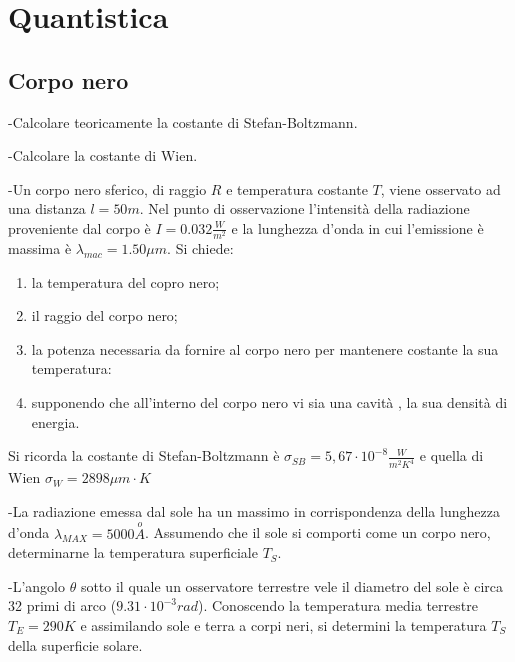 \documentclass[12pt,twoside,a4]{article}
\begin{document}
\newpage
{}
\section{Quantistica}
\renewcommand{\theindexese}{$\Q$}
\setcounter{subsection}{6}
\subsection{Corpo nero}
\begin{esercizio}
	-Calcolare teoricamente la costante di Stefan-Boltzmann.
	
\end{esercizio}

\begin{esercizio}
	-Calcolare la costante di Wien.
\end{esercizio}

\begin{esercizio}
	-Un corpo nero sferico, di raggio $R$ e temperatura costante $T$, viene osservato ad una distanza $l = 50 m$. Nel punto di osservazione l'intensità  della
radiazione proveniente dal corpo  è $I = 0.032 \frac{W}{m^2}$ e la lunghezza d'onda in cui 
l'emissione è massima è $\lambda_{mac}=1.50 \mu m$. Si chiede:
\begin{enumerate}[label=(\textit{\roman*})]
	\item la temperatura del copro nero;
	\item il raggio del corpo nero;
	\item la potenza necessaria da fornire al corpo nero per mantenere costante la sua temperatura:
	\item supponendo che all'interno del corpo nero vi sia una cavità , la sua densità  di energia.
\end{enumerate}
Si ricorda la costante di Stefan-Boltzmann è $\sigma_{SB}=5,67 \cdot 10^{-8} \frac{W}{m^2 K^4}$ e quella di Wien  $\sigma_W =2898 \mu m\cdot K$
\end{esercizio}

\begin{esercizio}
	-La radiazione emessa dal sole ha un massimo in corrispondenza della lunghezza d'onda $\lambda_{MAX}=5000 \overset{o}{A}$. Assumendo che il sole si comporti come un corpo nero, determinarne la temperatura superficiale $T_S$.
\end{esercizio}

\newpage
\begin{esercizio}
	-L'angolo $\theta$ sotto il quale un osservatore terrestre vele il diametro del sole è circa 32 primi di arco ($9.31 \cdot 10^{-3} rad$). Conoscendo la temperatura media terrestre $T_E = 290 K$ e assimilando sole e terra a corpi neri, si determini la temperatura $T_S$ della superficie solare.
\end{esercizio}
\end{document}
